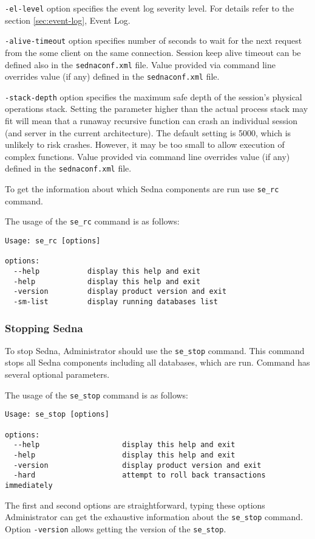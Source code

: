 \documentclass[a4paper,12pt]{article}
\begin{document}
\verb!-el-level! option specifies the event log severity level. For details
refer to the section \ref{sec:event-log}, Event Log.

\verb!-alive-timeout! option specifies number of seconds to wait for the next
request from the some client on the same connection. Session keep alive timeout
can be defined also in the \verb!sednaconf.xml! file. Value provided via command
line overrides value (if any) defined in the \verb!sednaconf.xml! file.

\verb!-stack-depth! option specifies the maximum safe depth of the session's 
physical operations stack. Setting the parameter higher than the actual process
stack may fit will mean that a runaway recursive function can crash an individual
session (and server in the current architecture). The default setting is 5000, 
which is unlikely to risk crashes. However, it may be too small to allow
execution of complex functions. Value provided via command line overrides value
(if any) defined in the \verb!sednaconf.xml! file.

To get the information about which Sedna components are run use \verb!se_rc!
command.

The usage of the \verb!se_rc! command is as follows:

\begin{verbatim}
Usage: se_rc [options]

options:
  --help		   display this help and exit
  -help			   display this help and exit
  -version		   display product version and exit
  -sm-list         display running databases list
\end{verbatim}


\subsubsection{Stopping Sedna}

To stop Sedna, Administrator should use the \verb!se_stop! command. This command
stops all Sedna components including all databases, which are run. Command has
several optional parameters. 

The usage of the \verb!se_stop! command is as follows:

\begin{verbatim}
Usage: se_stop [options]

options:
  --help                   display this help and exit
  -help                    display this help and exit
  -version                 display product version and exit
  -hard                    attempt to roll back transactions immediately
\end{verbatim}
The first and second options are straightforward, typing these options Administrator can get the exhaustive information about the \verb!se_stop! command. Option \verb!-version! allows getting the version of the \verb!se_stop!.
\end{document}
